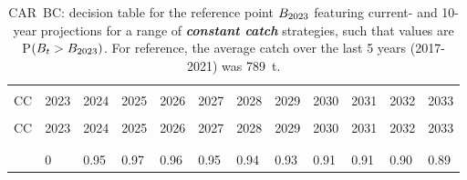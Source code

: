 \documentclass[11pt]{book}
\newcommand{\itbf}[1]{\textit{\textbf{#1}}}
\begin{document}
\begin{longtable}[c]{>{\raggedright\let\newline\\\arraybackslash\hspace{0pt}}p{0.52in}>{\raggedleft\let\newline\\\arraybackslash\hspace{0pt}}p{0.52in}>{\raggedleft\let\newline\\\arraybackslash\hspace{0pt}}p{0.52in}>{\raggedleft\let\newline\\\arraybackslash\hspace{0pt}}p{0.52in}>{\raggedleft\let\newline\\\arraybackslash\hspace{0pt}}p{0.52in}>{\raggedleft\let\newline\\\arraybackslash\hspace{0pt}}p{0.52in}>{\raggedleft\let\newline\\\arraybackslash\hspace{0pt}}p{0.52in}>{\raggedleft\let\newline\\\arraybackslash\hspace{0pt}}p{0.52in}>{\raggedleft\let\newline\\\arraybackslash\hspace{0pt}}p{0.52in}>{\raggedleft\let\newline\\\arraybackslash\hspace{0pt}}p{0.52in}>{\raggedleft\let\newline\\\arraybackslash\hspace{0pt}}p{0.52in}>{\raggedleft\let\newline\\\arraybackslash\hspace{0pt}}p{0.52in}}
  \caption{CAR~BC: decision table for the reference point $B_{2023}$ featuring current- and 10-year projections for a range of \itbf{constant catch} strategies, such that values are P$(B_t > B_{2023})$.  For reference, the average catch over the last 5 years (2017-2021) was 789~t. } \label{tab:car.gmu.Bcurr.CCs}\\  \hline\\[-2.2ex]  CC  & 2023 & 2024 & 2025 & 2026 & 2027 & 2028 & 2029 & 2030 & 2031 & 2032 & 2033 \\[0.2ex]\hline\\[-1.5ex]  \endfirsthead   \hline  CC  & 2023 & 2024 & 2025 & 2026 & 2027 & 2028 & 2029 & 2030 & 2031 & 2032 & 2033 \\[0.2ex]\hline\\[-1.5ex]  \endhead  \hline\\[-2.2ex]   \endfoot  \hline \endlastfoot  0 & 0 & 0.95 & 0.97 & 0.96 & 0.95 & 0.94 & 0.93 & 0.91 & 0.91 & 0.90 & 0.89 \\ 

\end{longtable}
\end{document}
